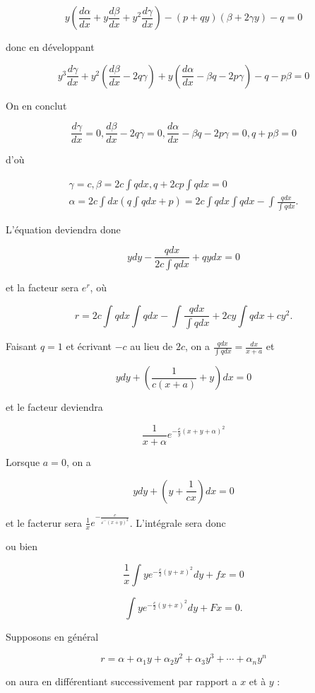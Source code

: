 \documentclass{article}
\begin{document}
\[
y\left(\frac{d \alpha}{d x}+y \frac{d \beta}{d x}+y^{2} \frac{d \gamma}{d x}\right)-(p+q y)(\beta+2 \gamma y)-q=0
\]

donc en développant

\[
y^{3} \frac{d \gamma}{d x}+y^{2}\left(\frac{d \beta}{d x}-2 q \gamma\right)+y\left(\frac{d \alpha}{d x}-\beta q-2 p \gamma\right)-q-p \beta=0
\]

On en conclut

\[
\frac{d \gamma}{d x}=0, \frac{d \beta}{d x}-2 q \gamma=0, \frac{d \alpha}{d x}-\beta q-2 p \gamma=0, q+p \beta=0
\]

d'où

\[
\begin{gathered}
\gamma=c, \beta=2 c \int q d x, q+2 c p \int q d x=0 \\
\alpha=2 c \int d x\left(q \int q d x+p\right)=2 c \int q d x \int q d x-\int \frac{q d x}{\int q d x} .
\end{gathered}
\]

L'équation deviendra done

\[
y d y-\frac{q d x}{2 c \int q d x}+q y d x=0
\]

et la facteur sera \(e^{r}\), où

\[
r=2 c \int q d x \int q d x-\int \frac{q d x}{\int q d x}+2 c y \int q d x+c y^{2} .
\]

Faisant \(q=1\) et écrivant \(-c\) au lieu de \(2 c\), on a \(\frac{q d x}{\int q d x}=\frac{d x}{x+a}\) et

\[
y d y+\left(\frac{1}{c(x+a)}+y\right) d x=0
\]

et le facteur deviendra

\[
\frac{1}{x+\alpha} e^{-\frac{c}{y}(x+y+\alpha)^{2}}
\]

Lorsque \(a=0\), on a

\[
y d y+\left(y+\frac{1}{c x}\right) d x=0
\]

et le facterur sera \(\frac{1}{x} e^{-\frac{c}{\varepsilon^{-}(x+y)^{2}}}\). L'intégrale sera donc

ou bien

\[
\frac{1}{x} \int y e^{-\frac{c}{2}(y+x)^{2}} d y+f x=0
\]

\[
\int y e^{-\frac{c}{2}(y+x)^{2}} d y+F x=0 .
\]

Supposons en général

\[
r=\alpha+\alpha_{1} y+\alpha_{2} y^{2}+\alpha_{3} y^{3}+\cdots+\alpha_{n} y^{n}
\]

on aura en différentiant successivement par rapport a \(x\) et à \(y\) :
\end{document}
